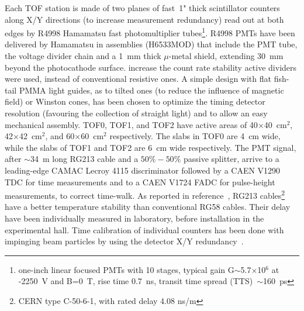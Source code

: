 Each TOF station is made of two planes of fast~1" thick scintillator
counters along X/Y directions (to increase measurement redundancy)
read out at both edges by R4998 Hamamatsu fast photomultiplier
tubes\footnote{one-inch linear focused PMTs with 10 stages, typical
  gain G$\sim$5.7$\times$10$^6$ at -2250~V and B=0~T, rise time
  0.7~ns, transit time spread (TTS)~$\sim$160~ps}.  R4998 PMTs have
been delivered by Hamamatsu in assemblies (H6533MOD) that include the
PMT tube, the voltage divider chain and a 1~mm thick $\mu$-metal
shield, extending 30~mm beyond the photocathode surface.
 increase the count rate stability active dividers
were used, instead of conventional resistive ones.  A simple design
with flat fish-tail PMMA light guides, as 
to tilted ones (to reduce the influence of magnetic field) or Winston
cones, has been chosen to optimize the timing detector resolution
(favouring the collection of straight light) and to allow an easy
mechanical assembly.   TOF0,
TOF1, and TOF2 have active areas of 40$\times$40~cm$^2$,
42$\times$42~cm$^2$, and 60$\times$60~cm$^2$ respectively.  The slabs
in TOF0 are 4~cm wide, while the slabs of TOF1 and TOF2 are 6~cm wide
respectively.  The PMT signal, after $\sim$34~m long
RG213 cable and a $50\%-50\%$ passive splitter, arrive to a
leading-edge CAMAC Lecroy 4115 discriminator followed by a CAEN V1290
TDC for time measurements and to a CAEN V1724 FADC for pulse-height
measurements, to correct time-walk. As reported in
reference~\cite{NOTE241}, RG213 cables\footnote{CERN type C-50-6-1,
  with rated delay 4.08 ns/m} have a better temperature stability than
conventional RG58 cables. Their delay have been individually measured
in laboratory, before installation in the experimental hall.  Time
calibration of individual counters has been done with impinging beam
particles by using the detector X/Y
redundancy~\cite{NOTE251}. 

